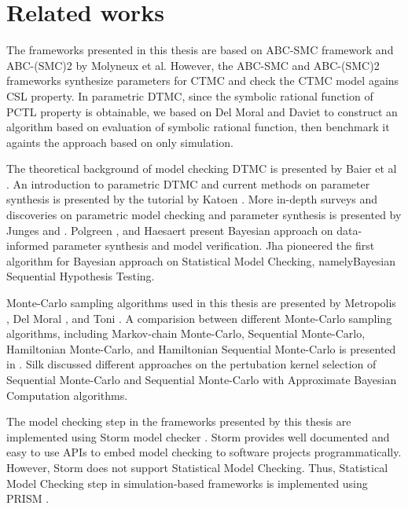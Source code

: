 \chapter{Related works}
The frameworks presented in this thesis are based on ABC-SMC framework \cite{molyneux2019bayesian}
and ABC-(SMC)2 \cite{molyneux2020abc} by Molyneux et al. However, the ABC-SMC and ABC-(SMC)2
frameworks synthesize parameters for CTMC and check the CTMC model agains CSL property. In
parametric DTMC, since the symbolic rational function of PCTL property is obtainable, we based on
Del Moral \cite{del2006sequential} and Daviet \cite{daviet2018inference} to construct an algorithm
based on evaluation of symbolic rational function, then benchmark it againts the approach based on
only simulation.

The theoretical background of model checking DTMC is presented by Baier et al
\cite{baier2008principles}. An introduction to parametric DTMC and current methods on parameter
synthesis is presented by the tutorial by Katoen \cite{katoen2016probabilistic}. More in-depth
surveys and discoveries on parametric model checking and parameter synthesis is presented by Junges
\cite{junges2020parameter} and \cite{hutschenreiter2017parametric}. Polgreen
\cite{polgreen2016data}, and Haesaert \cite{haesaert2015data} present Bayesian approach on
data-informed parameter synthesis and model verification. Jha \cite{jha2009bayesian} pioneered the
first algorithm for Bayesian approach on Statistical Model Checking, namelyBayesian Sequential
Hypothesis Testing.

Monte-Carlo sampling algorithms used in this thesis are presented by Metropolis
\cite{metropolis1953equation}, Del Moral \cite{del2006sequential}, and Toni
\cite{toni2009approximate}. A comparision between different Monte-Carlo sampling algorithms,
including Markov-chain Monte-Carlo, Sequential Monte-Carlo, Hamiltonian Monte-Carlo, and Hamiltonian
Sequential Monte-Carlo is presented in \cite{daviet2018inference}. Silk \cite{silk2012optimizing}
discussed different approaches on the pertubation kernel selection of Sequential Monte-Carlo and
Sequential Monte-Carlo with Approximate Bayesian Computation algorithms.

The model checking step in the frameworks presented by this thesis are implemented using Storm model
checker \cite{hensel2020probabilistic}. Storm provides well documented and easy to use APIs to embed
model checking to software projects programmatically. However, Storm does not support Statistical
Model Checking. Thus, Statistical Model Checking step in simulation-based frameworks is implemented
using PRISM \cite{kwiatkowska2011prism}.